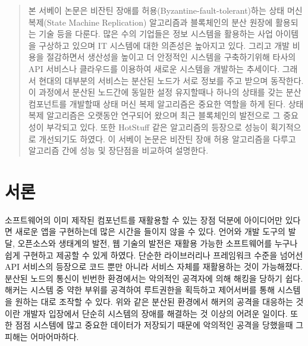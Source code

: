 
\date{작성일: 2020/12/08}


\maketitle

\renewcommand{\abstractname}{초록}
\begin{abstract}
본 서베이 논문은 비잔틴 장애를 허용(Byzantine-fault-tolerant)하는 
상태 머신 복제(State Machine Replication) 알고리즘과 블록체인의 분산 원장에 활용되는 기술 등을 다룬다. 
많은 수의 기업들은 정보 시스템을 활용하는 사업 아이템을 구상하고 있으며
IT 시스템에 대한 의존성은 높아지고 있다.
그리고 개발 비용을 절감하면서 생산성을 높이고 더 안정적인 시스템을 구축하기위해
타사의 API 서비스나 클라우드를 이용하여 새로운 시스템을 개발하는 추세이다.
그래서 현대의 대부분의 서비스는 분산된 노드가 서로 정보를 주고 받으며 동작한다.
이 과정에서 분산된 노드간에 동일한 설정 유지할때나 하나의 상태를 갖는 분산 컴포넌트를 개발할때
상태 머신 복제 알고리즘은 중요한 역할을 하게 된다.
상태 복제 알고리즘은 오랫동안 연구되어 왔으며 최근 블록체인의
발전으로 그 중요성이 부각되고 있다. 또한 HotStuff 같은 알고리즘의 등장으로 성능이 획기적으로
개선되기도 하였다. 이 서베이 논문은 비잔틴 장애 허용 알고리즘을 다루고
알고리즘 간에 성능 및 장단점을 비교하여 설명한다.

\end{abstract}

\section{서론}
\label{intro}
소프트웨어의 이미 제작된 컴포넌트를 재활용할 수 있는 장점 덕분에 
아이디어만 있다면 새로운 앱을 구현하는데 많은 시간을 들이지 않을 수 있다.
언어와 개발 도구의 발달, 오픈소스와 생태계의 발전, 웹 기술의 발전은 
재활용 가능한 소프트웨어를 누구나 쉽게 구현하고 제공할 수 있게 하였다.
단순한 라이브러리나 프레임워크 수준을 넘어선 API 서비스의 등장으로
코드 뿐만 아니라 서비스 자체를 재활용하는 것이 가능해졌다. 분산된 노드의
통신이 빈번한 환경에서는 악의적인 공격자에 의해 해킹을 당하기 쉽다.
해커는 시스템 중 약한 부위를 공격하여 루트권한을 획득하고 제어서버를 통해 
시스템을 원하는 대로 조작할 수 있다. 위와 같은 분산된 환경에서 해커의 공격을
대응하는 것이란 개발자 입장에서 단순히 시스템의 장애를 해결하는 것
이상의 어려운 일이다. 또한 점점 시스템에 많고 중요한 데이터가 저장되기 때문에 악의적인 공격을
당했을때 그 피해는 어마어마하다. 

